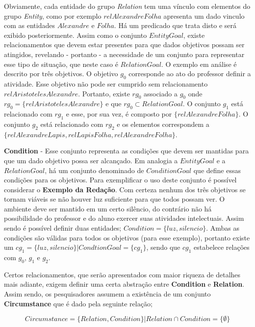 Obviamente, cada entidade do grupo \textit{Relation} tem uma vínculo com elementos do grupo \textit{Entity}, como por exemplo $relAlexandreFolha$ apresenta um dado vinculo com as entidades $Alexandre$ e $Folha$. Há um predicado que trata disto e será exibido posteriormente. Assim como o conjunto $EntityGoal$, existe relacionamentos que devem estar presentes para que dados objetivos possam ser atingidos, revelando - portanto - a necessidade de um conjunto para representar esse tipo de situação, que neste caso é $RelationGoal$. O exemplo em análise é descrito por três objetivos. O objetivo $g_0$ corresponde ao ato  do professor definir a atividade. Esse objetivo não pode ser cumprido sem relacionamento $relAristotelesAlexandre$. Portanto, existe $rg_0$ associado a $g_0$ onde $rg_0 = \{ relAristotelesAlexandre \}$ e que $rg_0 \subset RelationGoal$. O conjunto $g_1$ está relacionado com $rg_1$ e esse, por sua vez, é composto por $\{ relAlexandreFolha\}$. O conjunto $g_2$ está relacionado com $rg_2$ e os elementos correspondem a $\{ relAlexandreLapis, relLapisFolha, relAlexandreFolha\}$.

\textbf{Condition} - Esse conjunto representa as condições que devem ser mantidas para que um dado objetivo possa ser alcançado. Em analogia a $EntityGoal$ e a $RelationGoal$, há um conjunto denominado de $ConditionGoal$ que define essas condições para os objetivos. Para exemplificar o uso deste conjunto é possível considerar o \textbf{Exemplo da Redação}. Com certeza nenhum dos três objetivos se tornam viáveis se não houver luz suficiente para que todos possam ver. O ambiente deve ser mantido em um certo silêncio, do contrário não há possibilidade do professor e do aluno exercer suas atividades intelectuais. Assim sendo é possível definir duas entidades; $Condition = \{ luz,silencio \}$. Ambas as condições são válidas para todos os objetivos (para esse
exemplo), portanto existe um $cg_1 = \{ luz,silencio \} | CondtionGoal = \{ cg_1 \}$, sendo que $cg_1$ estabelece relações com 
$g_0$, $g_1$ e $g_2$.

Certos relacionamentos, que serão apresentados com maior riqueza de detalhes mais adiante, exigem definir uma certa abstração entre \textbf{Condition} e \textbf{Relation}. Assim sendo, os pesquisadores assumem a existência de um conjunto \textbf{Circumstance} que é dado pela seguinte relação; 

\begin{equation}
    Circumstance = \{ Relation, Condition \} |  Relation \cap Condition = \{ \emptyset \}
\end{equation}


